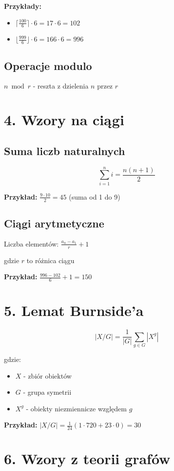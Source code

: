 \documentclass[10pt,a4paper]{article}
\begin{document}
\begin{multicols}{2}
\textbf{Przykłady:}
\begin{itemize}
\item $\lceil \frac{100}{6} \rceil \cdot 6 = 17 \cdot 6 = 102$
\item $\lfloor \frac{999}{6} \rfloor \cdot 6 = 166 \cdot 6 = 996$
\end{itemize}

\subsection*{Operacje modulo}
$n \bmod r$ - reszta z dzielenia $n$ przez $r$

\section*{4. Wzory na ciągi}

\subsection*{Suma liczb naturalnych}
$$\sum_{i=1}^{n} i = \frac{n(n+1)}{2}$$

\textbf{Przykład:} $\frac{9 \cdot 10}{2} = 45$ (suma od 1 do 9)

\subsection*{Ciągi arytmetyczne}
Liczba elementów: $\frac{a_n - a_1}{r} + 1$

gdzie $r$ to różnica ciągu

\textbf{Przykład:} $\frac{996 - 102}{6} + 1 = 150$

\section*{5. Lemat Burnside'a}

$$|X/G| = \frac{1}{|G|} \sum_{g \in G} |X^g|$$

gdzie:
\begin{itemize}
\item $X$ - zbiór obiektów
\item $G$ - grupa symetrii
\item $X^g$ - obiekty niezmiennicze względem $g$
\end{itemize}

\textbf{Przykład:} $|X/G| = \frac{1}{24}(1 \cdot 720 + 23 \cdot 0) = 30$

\section*{6. Wzory z teorii grafów}


\end{multicols}
\end{document}
